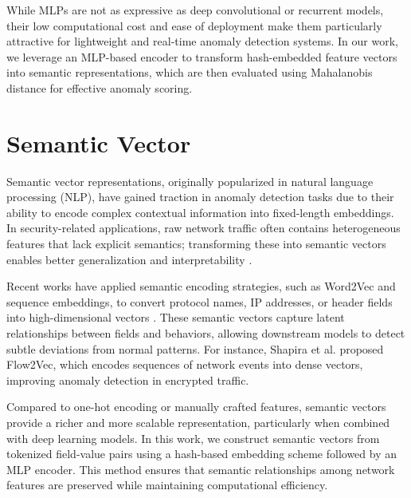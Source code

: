 \begin{ZhChapter}
    While MLPs are not as expressive as deep convolutional or recurrent models, their low computational cost and ease of deployment make them particularly attractive for lightweight and real-time anomaly detection systems. In our work, we leverage an MLP-based encoder to transform hash-embedded feature vectors into semantic representations, which are then evaluated using Mahalanobis distance for effective anomaly scoring.


    \section{Semantic Vector}
    Semantic vector representations, originally popularized in natural language processing (NLP), have gained traction in anomaly detection tasks due to their ability to encode complex contextual information into fixed-length embeddings. In security-related applications, raw network traffic often contains heterogeneous features that lack explicit semantics; transforming these into semantic vectors enables better generalization and interpretability \cite{mikolov2013distributed}.

    Recent works have applied semantic encoding strategies, such as Word2Vec and sequence embeddings, to convert protocol names, IP addresses, or header fields into high-dimensional vectors \cite{shapira2021flow,li2020embedding}. These semantic vectors capture latent relationships between fields and behaviors, allowing downstream models to detect subtle deviations from normal patterns. For instance, Shapira et al. \cite{shapira2021flow} proposed Flow2Vec, which encodes sequences of network events into dense vectors, improving anomaly detection in encrypted traffic.

    Compared to one-hot encoding or manually crafted features, semantic vectors provide a richer and more scalable representation, particularly when combined with deep learning models. In this work, we construct semantic vectors from tokenized field-value pairs using a hash-based embedding scheme followed by an MLP encoder. This method ensures that semantic relationships among network features are preserved while maintaining computational efficiency.

   

\end{ZhChapter}
